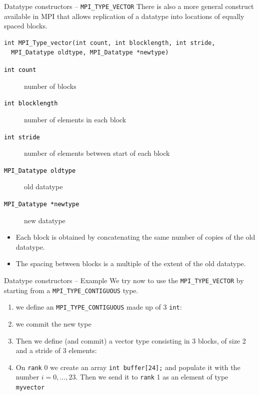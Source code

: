 \documentclass[xcolor={svgnames,usenames}]{beamer}
\begin{document}
\begin{frame}[fragile]{Datatype constructors -- \texttt{MPI_TYPE_VECTOR}}	
There is also a more general construct available in MPI that allows replication of a datatype into 
locations of equally spaced blocks.
\begin{verbatim}
int MPI_Type_vector(int count, int blocklength, int stride,
  MPI_Datatype oldtype, MPI_Datatype *newtype)
\end{verbatim}
\begin{description}
	\item[\textcolor{black}{\texttt{int count}}] number of blocks
	\item[\textcolor{black}{\texttt{int blocklength}}] number of elements in each block
	\item[\textcolor{black}{\texttt{int stride}}] number of elements between start of each block
	\item[\textcolor{black}{\texttt{MPI_Datatype oldtype}}] old datatype
	\item[\textcolor{black}{\texttt{MPI_Datatype *newtype}}] new datatype
\end{description}
\begin{itemize}
	\item Each block is obtained by concatenating the same number of copies of the old datatype.
	\item The spacing between blocks is a multiple of the extent of the old datatype.
\end{itemize}
\end{frame}

\begin{frame}[fragile]{Datatype constructors -- Example}	
We try now to use the \texttt{MPI_TYPE_VECTOR} by starting from a \texttt{MPI_TYPE_CONTIGUOUS} type.
\begin{enumerate}
\item we define an \texttt{MPI_TYPE_CONTIGUOUS} made up of $3$ \texttt{int}:
\item we commit the new type
\item Then we define (and commit) a vector type consisting in 3 blocks, of size 2 and a stride of 3 elements:
\item On \texttt{rank} 0 we create an array \texttt{int buffer[24];} and populate it with the number $i=0,\ldots,23$. Then we send it to \texttt{rank} 1 as an element of type \texttt{myvector}
\end{enumerate}
\end{frame}
\end{document}
